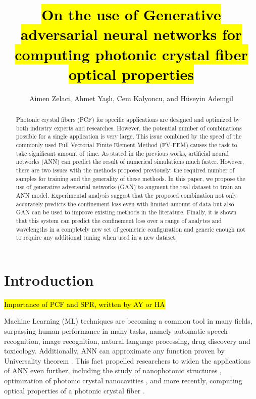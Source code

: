 \documentclass[draft, 10pt]{IEEEtran}
\begin{document}
\title{\hl{On the use of Generative adversarial neural networks for computing photonic crystal fiber optical properties}}

\author{Aimen Zelaci, Ahmet Yaşlı, Cem Kalyoncu, and Hüseyin Ademgil}

\maketitle
	
\begin{abstract}
Photonic crystal fibers (PCF) for specific applications are designed and optimized by both industry experts and researches. However, the potential number of combinations possible for a single application is very large. This issue combined by the speed of the commonly used Full Vectorial Finite Element Method (FV-FEM) causes the task to take significant amount of time. As stated in the previous works, artificial neural networks (ANN) can predict the result of numerical simulations much faster. However, there are two issues with the methods proposed previously: the required number of samples for training and the generality of these methods. In this paper, we  propose the use of generative adversarial networks (GAN) to augment the real dataset to train an ANN model. Experimental analysis suggest that the proposed combination not only accurately predicts the confinement loss even with limited amount of data but also GAN can be used to improve existing methods in the literature. Finally, it is shown that this system can predict the confinement loss over a range of analytes and wavelengths in a completely new set of geometric configuration and generic enough not to require any additional tuning when used in a new dataset.
\end{abstract}

\section{Introduction}

\hl{Importance of PCF and SPR, written by AY or HA}
	
Machine Learning (ML) techniques are becoming a common tool in many fields, surpassing human performance in many tasks, namely automatic speech recognition, image recognition, natural language processing, drug discovery and toxicology. Additionally, ANN can approximate any function proven by Universality theorem \cite{HORNIK1991251}. This fact propelled researchers to widen the applications of ANN even further, including the study of nanophotonic structures \cite{kiarashinejad2020knowledge}, optimization of photonic crystal nanocavities \cite{asano2018optimization}, and more recently, computing optical properties of a photonic crystal fiber \cite{paper0}.
\end{document}
